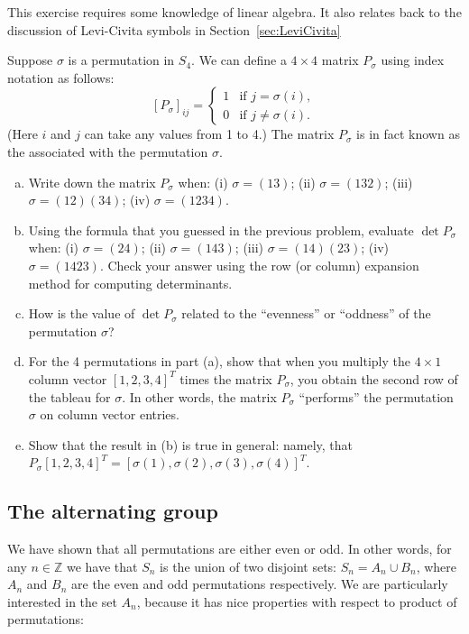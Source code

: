 \begin{exercise}{}
This exercise requires some knowledge of linear algebra. It also relates back to the discussion of Levi-Civita symbols in  Section~\ref{sec:LeviCivita}

 Suppose $\sigma$ is a permutation in $S_4$. We can define a $4 \times 4$ matrix $P_{\sigma}$ using index notation as follows:  
\[ [P_{\sigma}]_{ij} = \begin{cases} 1 &\text{if } j = \sigma(i), \\ 
 0 &\text{if } j \neq  \sigma(i).  \end{cases} \]
(Here $i$ and $j$ can take any values from 1 to 4.)  The matrix $P_{\sigma}$ is in fact known as the  associated with the permutation $\sigma$.
\begin{enumerate}[(a)]
\item
Write down the matrix $P_{\sigma}$ when: (i) $\sigma = (13)$; (ii) $\sigma = (132)$; (iii) $\sigma = (12)(34)$; (iv)  $\sigma = (1234)$.
\item
Using the formula that you guessed in the previous problem, evaluate $\det P_{\sigma}$ when: (i) $\sigma = (24)$; (ii) $\sigma = (143)$; (iii) $\sigma = (14)(23)$; (iv)  $\sigma = (1423)$. Check your answer using the row (or column) expansion method for computing determinants.
\item
How is the value of $\det P_{\sigma}$  related to the ``evenness'' or ``oddness'' of the permutation $\sigma$?
\item
For the 4 permutations in part (a), show that when you multiply the $4 \times 1$ column vector $[1,2,3,4]^T$ times the matrix $P_{\sigma}$, you obtain the second row of the tableau for $\sigma$.  In other words, the matrix $P_{\sigma}$ ``performs'' the permutation $\sigma$ on column vector entries.
\item
Show that the result in (b) is true in general: namely, that  $P_{\sigma}[1,2,3,4]^T = [\sigma(1),\sigma(2),\sigma(3),\sigma(4)]^T.$ 	
\end{enumerate}
\end{exercise}



\subsection{The alternating group}\label{sec:AlternatingGroup}

We have shown that all permutations are either even or odd. In other words, for any $n \in \mathbb{Z}$ we have that $S_n$ is the union of two disjoint sets: $S_n = A_n \cup B_n$, where $A_n$ and $B_n$ are the even and odd permutations respectively.
We are particularly interested in the set $A_n$, because it has nice properties with respect to product of permutations:

